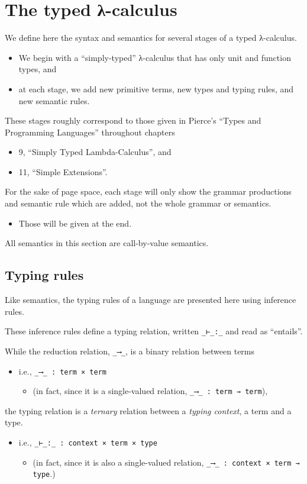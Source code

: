 \documentclass[11pt]{article}
\theoremstyle{definition}
\begin{document}
\section{The typed λ-calculus}
\label{sec:org488dc17}

We define here the syntax and semantics for several stages
of a typed λ-calculus.
\begin{itemize}
\item We begin with a “simply-typed” λ-calculus that has only
unit and function types, and
\item at each stage, we add new primitive terms, new types
and typing rules, and new semantic rules.
\end{itemize}

These stages roughly correspond to those given in
Pierce's “Types and Programming Languages” throughout
chapters
\begin{itemize}
\item 9, “Simply Typed Lambda-Calculus”, and
\item 11, “Simple Extensions”.
\end{itemize}

For the sake of page space, each stage will only show
the grammar productions and semantic rule which are added,
not the whole grammar or semantics.
\begin{itemize}
\item Those will be given at the end.
\end{itemize}

All semantics in this section are call-by-value semantics.

\subsection{Typing rules}
\label{sec:orgdede44f}

Like semantics, the typing rules of a language
are presented here using inference rules.

These inference rules define a typing relation,
written \texttt{\_⊢\_:\_} and read as “entails”.

While the reduction relation, \texttt{\_⟶\_}, is a binary relation between terms
\begin{itemize}
\item i.e., \texttt{\_⟶\_ : term × term}
\begin{itemize}
\item (in fact, since it is a single-valued relation, \texttt{\_⟶\_ : term → term}),
\end{itemize}
\end{itemize}
the typing relation is a \emph{ternary} relation between a \emph{typing context},
a term and a type.
\begin{itemize}
\item i.e., \texttt{\_⊢\_:\_ : context × term × type}
\begin{itemize}
\item (in fact, since it is also a single-valued relation,
\texttt{\_⟶\_ : context × term → type}.)
\end{itemize}
\end{itemize}
\end{document}
